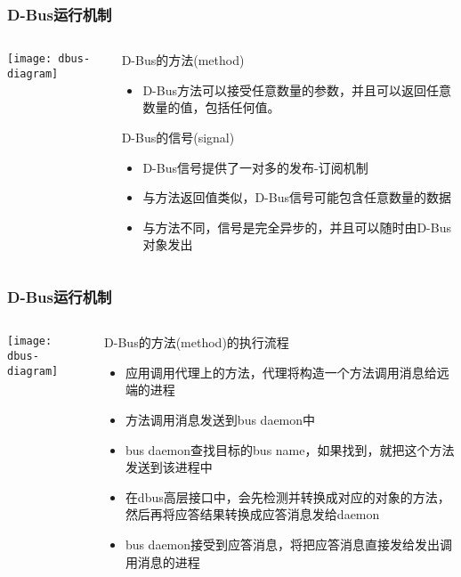 \begin{frame}[fragile]
	\frametitle{D-Bus运行机制}
	
	\begin{columns}
		\begin{column}{.4\textwidth}
			
			\texttt{[image: dbus-diagram]}
			
		\end{column}
		\begin{column}{.6\textwidth}
			D-Bus的方法(method)
			\begin{itemize}
				\item D-Bus方法可以接受任意数量的参数，并且可以返回任意数量的值，包括任何值。				
			\end{itemize}
			D-Bus的信号(signal)
			\begin{itemize}
				\item D-Bus信号提供了一对多的发布-订阅机制
				\item 与方法返回值类似，D-Bus信号可能包含任意数量的数据
				\item 与方法不同，信号是完全异步的，并且可以随时由D-Bus对象发出 			
			\end{itemize}		
		\end{column}
	\end{columns}
\end{frame}

\begin{frame}[fragile]
	\frametitle{D-Bus运行机制}
	
	\begin{columns}
		\begin{column}{.4\textwidth}
			
			\texttt{[image: dbus-diagram]}
			
		\end{column}
		\begin{column}{.6\textwidth}
			D-Bus的方法(method)的执行流程
			\begin{itemize}				
				\item 应用调用代理上的方法，代理将构造一个方法调用消息给远端的进程
				\item 方法调用消息发送到bus daemon中
				\item bus daemon查找目标的bus name，如果找到，就把这个方法发送到该进程中
				\item 在dbus高层接口中，会先检测并转换成对应的对象的方法，然后再将应答结果转换成应答消息发给daemon
				\item bus daemon接受到应答消息，将把应答消息直接发给发出调用消息的进程		
			\end{itemize}		
		\end{column}
	\end{columns}
\end{frame}

